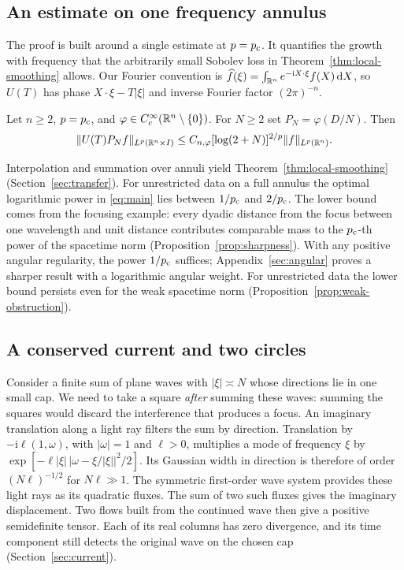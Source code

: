 

\subsection{An estimate on one frequency annulus}\label{subsec:annular}

The proof is built around a single estimate at \(p=p_{\mathrm c}\). It quantifies
the growth with frequency that the arbitrarily small Sobolev loss in
Theorem~\ref{thm:local-smoothing} allows. Our Fourier convention is
\(\widehat f(\xi)=\int_{\mathbb R^n}e^{-\mathrm iX\cdot\xi}f(X)\,\mathrm d X\),
so \(U(T)\) has phase \(X\cdot\xi-T|\xi|\) and inverse Fourier factor
\((2\pi)^{-n}\).

\begin{theorem}\label{thm:main}
Let \(n\ge2\), \(p=p_{\mathrm c}\), and \(\varphi\in C_c^\infty(\mathbb R^n\setminus\{0\})\).
For \(N\ge2\) set \(P_N=\varphi(D/N)\). Then
\begin{equation}\label{eq:main}
 \|U(T)P_N f\|_{L^p(\mathbb R^n\times I)}
       \le C_{n,\varphi}[\log(2+N)]^{2/p}\|f\|_{L^p(\mathbb R^n)} .
\end{equation}
\end{theorem}

Interpolation and summation over annuli yield
Theorem~\ref{thm:local-smoothing} (Section~\ref{sec:transfer}).
For unrestricted data on a full annulus the optimal logarithmic power in \eqref{eq:main}
lies between \(1/p_{\mathrm c}\) and \(2/p_{\mathrm c}\). The lower bound comes from the
focusing example: every dyadic distance from the focus between one
wavelength and unit distance contributes comparable mass to the
\(p_{\mathrm c}\)-th power of the spacetime norm (Proposition~\ref{prop:sharpness}).
With any positive angular regularity, the power \(1/p_{\mathrm c}\) suffices;
Appendix~\ref{sec:angular} proves a sharper result with a logarithmic
angular weight. For unrestricted data the lower bound persists even
for the weak spacetime norm (Proposition~\ref{prop:weak-obstruction}).

\subsection{A conserved current and two circles}\label{sec:idea}

Consider a finite sum of plane waves with $|\xi|\asymp N$ whose
directions lie in one small cap. We need to take a square \emph{after} summing these waves:
summing the squares would discard the interference that produces a
focus. An imaginary translation along a light ray filters the sum by
direction. Translation by $-\mathrm i\ell(1,\omega)$, with $|\omega|=1$ and
$\ell>0$, multiplies a mode of frequency $\xi$ by
$\exp[-\ell|\xi|\,|\omega-\xi/|\xi||^2/2]$. Its Gaussian width
in direction is therefore of order $(N\ell)^{-1/2}$ for $N\ell\gg1$.
The symmetric first-order wave system provides these light rays as
its quadratic fluxes. The sum of two such fluxes gives the imaginary
displacement. Two flows built from the continued wave then give a
positive semidefinite tensor. Each of its real columns has zero divergence,
and its time component still detects the original wave on the chosen cap
(Section~\ref{sec:current}).

